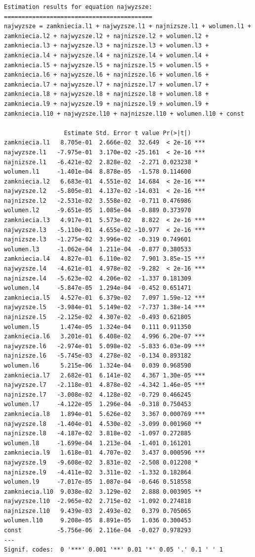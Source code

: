 \documentclass[
  polish,
  letterpaper,
  DIV=11,
  numbers=noendperiod]{scrartcl}
\begin{document}
\begin{verbatim}
Estimation results for equation najwyzsze: 
========================================== 
najwyzsze = zamkniecia.l1 + najwyzsze.l1 + najnizsze.l1 + wolumen.l1 + zamkniecia.l2 + najwyzsze.l2 + najnizsze.l2 + wolumen.l2 + zamkniecia.l3 + najwyzsze.l3 + najnizsze.l3 + wolumen.l3 + zamkniecia.l4 + najwyzsze.l4 + najnizsze.l4 + wolumen.l4 + zamkniecia.l5 + najwyzsze.l5 + najnizsze.l5 + wolumen.l5 + zamkniecia.l6 + najwyzsze.l6 + najnizsze.l6 + wolumen.l6 + zamkniecia.l7 + najwyzsze.l7 + najnizsze.l7 + wolumen.l7 + zamkniecia.l8 + najwyzsze.l8 + najnizsze.l8 + wolumen.l8 + zamkniecia.l9 + najwyzsze.l9 + najnizsze.l9 + wolumen.l9 + zamkniecia.l10 + najwyzsze.l10 + najnizsze.l10 + wolumen.l10 + const 

                 Estimate Std. Error t value Pr(>|t|)    
zamkniecia.l1   8.705e-01  2.666e-02  32.649  < 2e-16 ***
najwyzsze.l1   -7.975e-01  3.170e-02 -25.161  < 2e-16 ***
najnizsze.l1   -6.421e-02  2.828e-02  -2.271 0.023238 *  
wolumen.l1     -1.401e-04  8.878e-05  -1.578 0.114600    
zamkniecia.l2   6.683e-01  4.551e-02  14.684  < 2e-16 ***
najwyzsze.l2   -5.805e-01  4.137e-02 -14.031  < 2e-16 ***
najnizsze.l2   -2.531e-02  3.558e-02  -0.711 0.476986    
wolumen.l2     -9.651e-05  1.085e-04  -0.889 0.373970    
zamkniecia.l3   4.917e-01  5.573e-02   8.822  < 2e-16 ***
najwyzsze.l3   -5.110e-01  4.655e-02 -10.977  < 2e-16 ***
najnizsze.l3   -1.275e-02  3.996e-02  -0.319 0.749601    
wolumen.l3     -1.062e-04  1.211e-04  -0.877 0.380533    
zamkniecia.l4   4.827e-01  6.110e-02   7.901 3.85e-15 ***
najwyzsze.l4   -4.621e-01  4.978e-02  -9.282  < 2e-16 ***
najnizsze.l4   -5.623e-02  4.206e-02  -1.337 0.181309    
wolumen.l4     -5.847e-05  1.294e-04  -0.452 0.651471    
zamkniecia.l5   4.527e-01  6.379e-02   7.097 1.59e-12 ***
najwyzsze.l5   -3.984e-01  5.149e-02  -7.737 1.38e-14 ***
najnizsze.l5   -2.125e-02  4.307e-02  -0.493 0.621805    
wolumen.l5      1.474e-05  1.324e-04   0.111 0.911350    
zamkniecia.l6   3.201e-01  6.408e-02   4.996 6.20e-07 ***
najwyzsze.l6   -2.974e-01  5.098e-02  -5.833 6.03e-09 ***
najnizsze.l6   -5.745e-03  4.278e-02  -0.134 0.893182    
wolumen.l6      5.215e-06  1.324e-04   0.039 0.968590    
zamkniecia.l7   2.682e-01  6.141e-02   4.367 1.30e-05 ***
najwyzsze.l7   -2.118e-01  4.878e-02  -4.342 1.46e-05 ***
najnizsze.l7   -3.008e-02  4.128e-02  -0.729 0.466245    
wolumen.l7     -4.122e-05  1.296e-04  -0.318 0.750453    
zamkniecia.l8   1.894e-01  5.626e-02   3.367 0.000769 ***
najwyzsze.l8   -1.404e-01  4.530e-02  -3.099 0.001960 ** 
najnizsze.l8   -4.187e-02  3.818e-02  -1.097 0.272885    
wolumen.l8     -1.699e-04  1.213e-04  -1.401 0.161201    
zamkniecia.l9   1.618e-01  4.707e-02   3.437 0.000596 ***
najwyzsze.l9   -9.608e-02  3.831e-02  -2.508 0.012208 *  
najnizsze.l9   -4.411e-02  3.311e-02  -1.332 0.182864    
wolumen.l9     -7.017e-05  1.087e-04  -0.646 0.518558    
zamkniecia.l10  9.038e-02  3.129e-02   2.888 0.003905 ** 
najwyzsze.l10  -2.965e-02  2.715e-02  -1.092 0.274818    
najnizsze.l10   9.439e-03  2.493e-02   0.379 0.705065    
wolumen.l10     9.208e-05  8.891e-05   1.036 0.300453    
const          -5.756e-06  2.116e-04  -0.027 0.978293    
---
Signif. codes:  0 '***' 0.001 '**' 0.01 '*' 0.05 '.' 0.1 ' ' 1



\end{verbatim}
\end{document}
